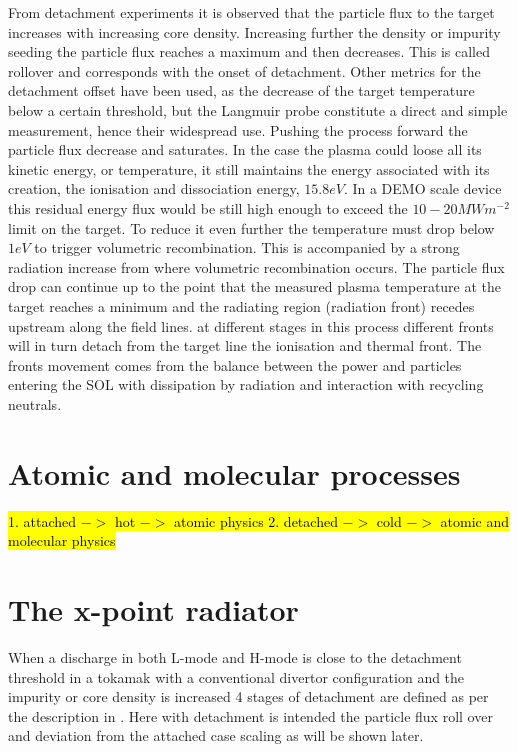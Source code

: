 From detachment experiments it is observed that the particle flux to the target increases with increasing core density. Increasing further the density or impurity seeding the particle flux reaches a maximum and then decreases. This is called rollover and corresponds with the onset of detachment. Other metrics for the detachment offset have been used, as the decrease of the target temperature below a certain threshold\cite{Stangeby2000,Goldston2017}, but the Langmuir probe constitute a direct and simple measurement, hence their widespread use. Pushing the process forward the particle flux decrease and saturates. In the case the plasma could loose all its kinetic energy, or temperature, it still maintains the energy associated with its creation, the ionisation and dissociation energy, $15.8eV$. In a DEMO scale device this residual energy flux would be still high enough to exceed the $10-20 MWm^{-2}$ limit on the target. \cite{Krasheninnikov2017a} To reduce it even further the temperature must drop below $1eV$ to trigger volumetric recombination. This is accompanied by a strong radiation increase from where volumetric recombination occurs. The particle flux drop can continue up to the point that the measured plasma temperature at the target reaches a minimum and the radiating region (radiation front) recedes upstream along the field lines.\cite{Krasheninnikov1999} at different stages in this process different fronts will in turn detach from the target line the ionisation and thermal front.\cite{Hutchinson1994,Loarte1998,Lipschultz2016} The fronts movement comes from the balance between the power and particles entering the SOL with dissipation by radiation and interaction with recycling neutrals.


\section{Atomic and molecular processes}
\hl{
            1. attached $->$ hot $->$ atomic physics
            2. detached $->$ cold $->$ atomic and molecular physics}
\section{The x-point radiator}\label{The x-point radiator}

When a discharge in both L-mode and H-mode is close to the detachment threshold in a tokamak with a conventional divertor configuration and the impurity or core density is increased 4 stages of detachment are defined as per the description in \cite{Reimold2015,Potzel2014}. Here with detachment is intended the particle flux roll over and deviation from the attached case scaling as will be shown later.


